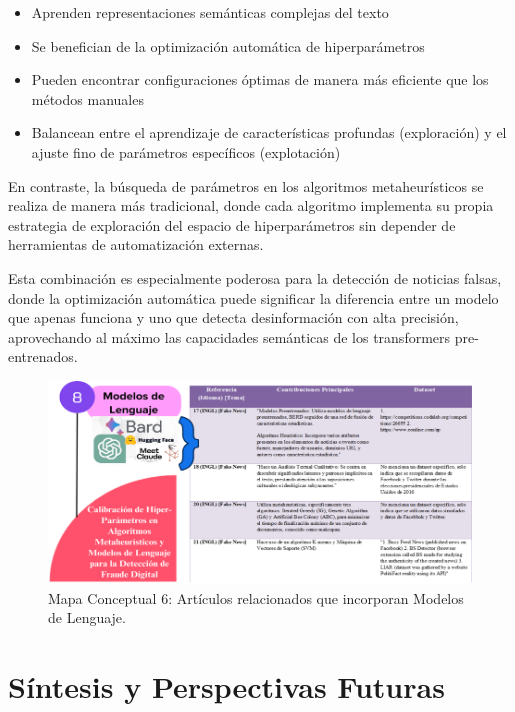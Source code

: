 \begin{itemize}
    \item Aprenden representaciones semánticas complejas del texto
    \item Se benefician de la optimización automática de hiperparámetros
    \item Pueden encontrar configuraciones óptimas de manera más eficiente que los métodos manuales
    \item Balancean entre el aprendizaje de características profundas (exploración) y el ajuste fino de parámetros específicos (explotación)
\end{itemize}

En contraste, la búsqueda de parámetros en los algoritmos metaheurísticos se realiza de manera más tradicional, donde cada algoritmo implementa su propia estrategia de exploración del espacio de hiperparámetros sin depender de herramientas de automatización externas.

Esta combinación es especialmente poderosa para la detección de noticias falsas, donde la optimización automática puede significar la diferencia entre un modelo que apenas funciona y uno que detecta desinformación con alta precisión, aprovechando al máximo las capacidades semánticas de los transformers pre-entrenados.

\begin{figure}[h!]
    \centering
    \includegraphics[width=\textwidth]{Imagenes/mapaConceptual6.png}
    \caption{Mapa Conceptual 6: Artículos relacionados que incorporan Modelos de Lenguaje.}
    \label{fig:mapa_conceptual_6}
\end{figure}

\section{Síntesis y Perspectivas Futuras}
\label{sec:sintesis_perspectivas}

